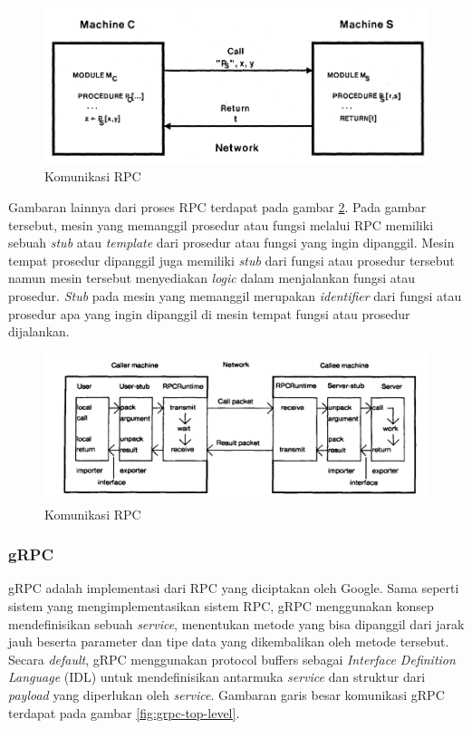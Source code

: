 \begin{figure}[H]
  \centering
  \includegraphics[scale=0.3]{gambar/rpc-communication.png}
  \caption{Komunikasi RPC \parencite{rpc}}
  \label{fig:rpc-communication}
\end{figure}

Gambaran lainnya dari proses RPC terdapat pada gambar \ref{fig:rpc-communication-2}.
Pada gambar tersebut, mesin yang memanggil prosedur atau fungsi melalui RPC memiliki sebuah
\emph{stub} atau \emph{template} dari prosedur atau fungsi yang ingin dipanggil. Mesin
tempat prosedur dipanggil juga memiliki \emph{stub} dari fungsi atau prosedur tersebut namun
mesin tersebut menyediakan \emph{logic} dalam menjalankan fungsi atau prosedur. \emph{Stub}
pada mesin yang memanggil merupakan \emph{identifier} dari fungsi atau prosedur apa yang ingin
dipanggil di mesin tempat fungsi atau prosedur dijalankan.

\begin{figure}[H]
  \centering
  \includegraphics[scale=0.35]{gambar/rpc-communication-2.png}
  \caption{Komunikasi RPC \parencite{implementing-rpc}}
  \label{fig:rpc-communication-2}
\end{figure}

\subsubsection{gRPC}

gRPC adalah implementasi dari RPC yang diciptakan oleh Google. Sama seperti sistem
yang mengimplementasikan sistem RPC, gRPC menggunakan konsep mendefinisikan sebuah \emph{service},
menentukan metode yang bisa dipanggil dari jarak jauh beserta parameter dan tipe data yang
dikembalikan oleh metode tersebut. Secara \emph{default}, gRPC menggunakan protocol buffers
sebagai \emph{Interface Definition Language} (IDL) untuk mendefinisikan antarmuka \emph{service}
dan struktur dari \emph{payload} yang diperlukan oleh \emph{service}. Gambaran garis besar
komunikasi gRPC terdapat pada gambar \ref{fig:grpc-top-level}.

